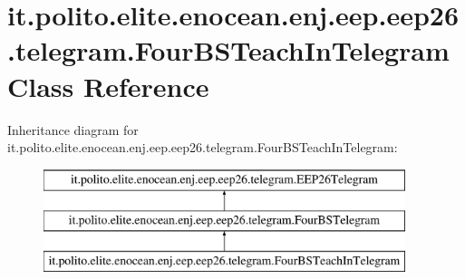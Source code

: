 \hypertarget{classit_1_1polito_1_1elite_1_1enocean_1_1enj_1_1eep_1_1eep26_1_1telegram_1_1_four_b_s_teach_in_telegram}{}\section{it.\+polito.\+elite.\+enocean.\+enj.\+eep.\+eep26.\+telegram.\+Four\+B\+S\+Teach\+In\+Telegram Class Reference}
\label{classit_1_1polito_1_1elite_1_1enocean_1_1enj_1_1eep_1_1eep26_1_1telegram_1_1_four_b_s_teach_in_telegram}
Inheritance diagram for it.\+polito.\+elite.\+enocean.\+enj.\+eep.\+eep26.\+telegram.\+Four\+B\+S\+Teach\+In\+Telegram\+:\begin{figure}[H]
\begin{center}
\leavevmode
\includegraphics[height=3.000000cm]{classit_1_1polito_1_1elite_1_1enocean_1_1enj_1_1eep_1_1eep26_1_1telegram_1_1_four_b_s_teach_in_telegram}
\end{center}
\end{figure}
